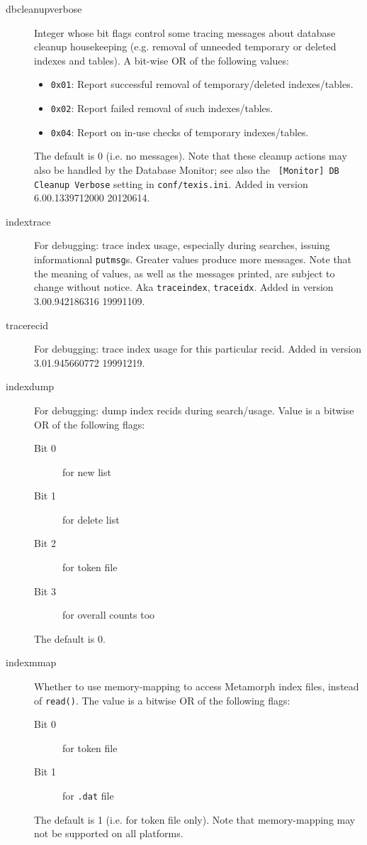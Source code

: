 \begin{description}
\item[dbcleanupverbose] Integer whose bit flags control some tracing
messages about database cleanup housekeeping (e.g. removal of unneeded
temporary or deleted indexes and tables).  A bit-wise OR of the
following values:

\begin{itemize}
  \item \verb`0x01`: Report successful removal of temporary/deleted
    indexes/tables.
  \item \verb`0x02`: Report failed removal of such indexes/tables.
  \item \verb`0x04`: Report on in-use checks of temporary indexes/tables.
\end{itemize}

The default is 0 (i.e. no messages).  Note that these cleanup actions
may also be handled by the Database Monitor; see also the {\tt
[Monitor] DB Cleanup Verbose} setting in {\tt conf/texis.ini}.  Added
in version 6.00.1339712000 20120614.

\item[indextrace] For debugging: trace index usage, especially during
searches, issuing informational \verb`putmsg`s.  Greater values
produce more messages.  Note that the meaning of values, as well as
the messages printed, are subject to change without notice.
Aka \verb`traceindex`, \verb`traceidx`.  Added
in version 3.00.942186316 19991109.

\item[tracerecid] For debugging: trace index usage for this particular
recid.  Added in version 3.01.945660772 19991219.

\item[indexdump] For debugging: dump index recids during search/usage.
Value is a bitwise OR of the following flags:
\begin{description}
\item[Bit 0] for new list
\item[Bit 1] for delete list
\item[Bit 2] for token file
\item[Bit 3] for overall counts too
\end{description}
The default is 0.

\item[indexmmap] Whether to use memory-mapping to access Metamorph
index files, instead of \verb`read()`.  The value is a bitwise OR
of the following flags:
\begin{description}
\item[Bit 0] for token file
\item[Bit 1] for \verb`.dat` file
\end{description}
The default is 1 (i.e. for token file only).  Note that memory-mapping
may not be supported on all platforms.


\end{description}
